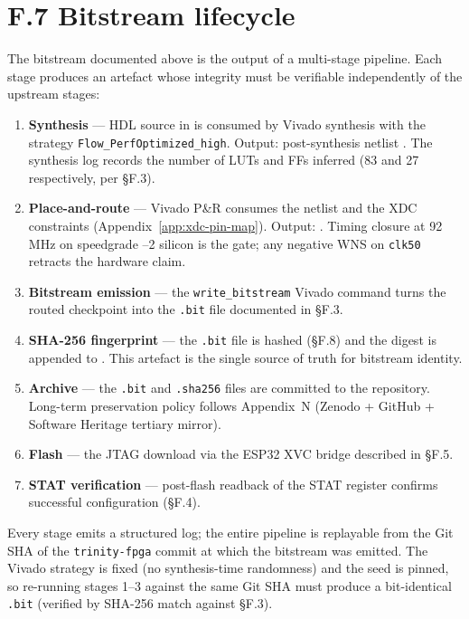 \section*{F.7 Bitstream lifecycle}
\label{sec:appF-lifecycle}

The bitstream documented above is the output of a multi-stage pipeline.
Each stage produces an artefact whose integrity must be verifiable
independently of the upstream stages:

\begin{enumerate}
  \item \textbf{Synthesis} --- HDL source in 
    is consumed by Vivado synthesis with the strategy
    \texttt{Flow\_PerfOptimized\_high}. Output: post-synthesis netlist
    . The synthesis
    log records the number of LUTs and FFs inferred (83 and 27
    respectively, per \S F.3).
  \item \textbf{Place-and-route} --- Vivado P\&R consumes the netlist
    and the XDC constraints (Appendix~\ref{app:xdc-pin-map}). Output:
    . Timing closure at
    92\,MHz on speedgrade --2 silicon is the gate; any negative WNS
    on \texttt{clk50} retracts the hardware claim.
  \item \textbf{Bitstream emission} --- the \texttt{write\_bitstream}
    Vivado command turns the routed checkpoint into the \texttt{.bit}
    file documented in \S F.3.
  \item \textbf{SHA-256 fingerprint} --- the \texttt{.bit} file is
    hashed (\S F.8) and the digest is appended to
    . This artefact
    is the single source of truth for bitstream identity.
  \item \textbf{Archive} --- the \texttt{.bit} and \texttt{.sha256}
    files are committed to the  repository.
    Long-term preservation policy follows Appendix~N (Zenodo +
    GitHub + Software Heritage tertiary mirror).  %
  \item \textbf{Flash} --- the JTAG download via the ESP32 XVC bridge
    described in \S F.5.
  \item \textbf{STAT verification} --- post-flash readback of the STAT
    register confirms successful configuration (\S F.4).
\end{enumerate}

Every stage emits a structured log; the entire pipeline is replayable
from the Git SHA of the \texttt{trinity-fpga} commit at which the
bitstream was emitted. The Vivado strategy is fixed (no synthesis-time
randomness) and the seed is pinned, so re-running stages 1--3 against
the same Git SHA must produce a bit-identical \texttt{.bit} (verified
by SHA-256 match against \S F.3).

